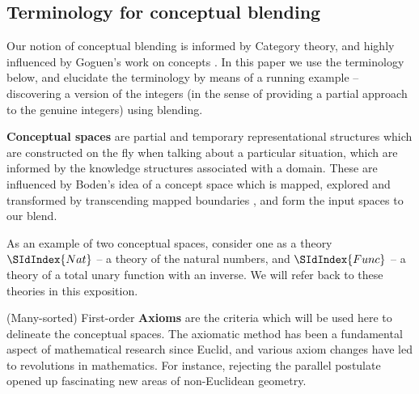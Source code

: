 

\subsection{Terminology for conceptual blending}
Our notion of conceptual blending is informed by Category theory, and
highly influenced by Goguen's work on concepts \parencite{Gog05b}. In
this paper we use the terminology below, and elucidate the terminology
by means of a running example -- discovering a version of the integers
(in the sense of providing a partial approach to the genuine integers)
using blending.

{\bf Conceptual spaces} are partial and temporary representational
structures which are constructed on the fly when talking about a
particular situation, which are informed by the knowledge structures
associated with a domain. These are influenced by Boden's idea of a
concept space which is mapped, explored and transformed by
transcending mapped boundaries \parencite{boden}, and form the input spaces
to our blend. 

As an example of two conceptual spaces, consider one as a theory
$\SIdIndex{Nat}$ --
a theory of the natural numbers, and $\SIdIndex{Func}$ -- a theory of a total
unary function with an inverse. 
We will refer back to these theories in this exposition.

(Many-sorted) First-order {\bf Axioms} are the criteria which will be
used here to delineate the conceptual
spaces. The axiomatic method has been a fundamental aspect of
mathematical research since Euclid, and various axiom changes have led
to revolutions in mathematics. For instance, 
rejecting
the parallel postulate opened up fascinating new areas of
non-Euclidean geometry.

